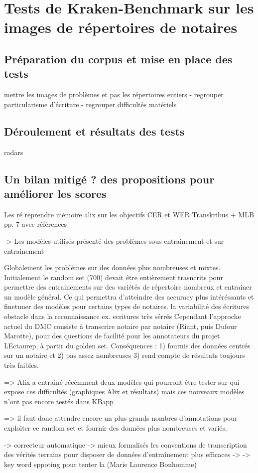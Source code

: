 \chapter{Tests de Kraken-Benchmark sur les images de répertoires de notaires}
\section{Préparation du corpus et mise en place des tests}
mettre les images de problèmes et pas les répertoires entiers 
- regrouper particularisme d'écriture 
- regrouper difficultés matériels 

\section{Déroulement et résultats des tests}

radars 


\section{Un bilan mitigé ? des propositions pour améliorer les scores}

Les ré
reprendre mémoire alix sur les objectifs  CER et WER Transkribus + MLB pp. 7 avec références

-> Les modèles utilisés présenté des problèmes sous entrainement et sur entrainement



Globalement les problèmes sur des données plus nombreuses et mixtes. Initialement le random set (700) devait être entièrement trasncrits 
pour permettre des entrainements sur des variétés de répertoire nombreux et entrainer un modèle général. Ce qui permettra d'atteindre des accuracy plus intéréssants et finetuner des modèles pour certains types de notaires. 
la variabilité des écritures obstacle dans la reconnaissance ex. ecritures très sérrés
Cependant l'approche actuel du DMC consiste à transcrire notaire par notaire (Riant, puis Dufour Marotte), pour des questions de facilité pour les annotateurs du projet LEctaurep, à partir du golden set. Conséquences : 1) fournis des données centrés sur un notaire et 2) pas assez nombreuses 3) rend compte de résultats toujours très faibles. 

=> Alix a entrainé récémment deux modèles qui pourront être tester sur qui expose ces difficultés (graphiques Alix et résultats) mais ces nouveaux modèles n'ont pas encore testés dans KBapp

=> il faut donc attendre encore un plus grands nombres d'annotations pour exploiter ce random set et fournir des données plus nombreuses et variés. 



-> correcteur automatique
-> mieux formalisés les conventions de transcription des vérités terrains pour disposer de données d'entraînement plus efficaces
-> 
-> key word sppoting pour tenter la (Marie Laurence Bonhomme)
